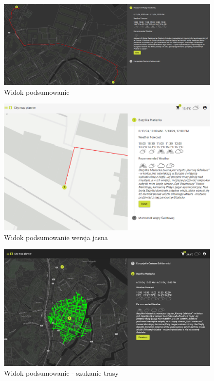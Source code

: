\begin{figure}[H]
    \centering
    \includegraphics[width=1\textwidth]{attachments/podsumowanie}
    \caption{Widok podsumowanie}
    \label{fig:podsumowanie}
\end{figure}
\begin{figure}[H]
    \centering
    \includegraphics[width=1\textwidth]{attachments/podsumowanie-light}
    \caption{Widok podsumowanie wersja jasna}
    \label{fig:podsumowanie-light}
\end{figure}

\begin{figure}[H]
    \centering
    \includegraphics[width=1\textwidth]{attachments/g1}
    \caption{Widok podsumowanie - szukanie trasy}
    \label{fig:podsumowanie-s1}
\end{figure}

